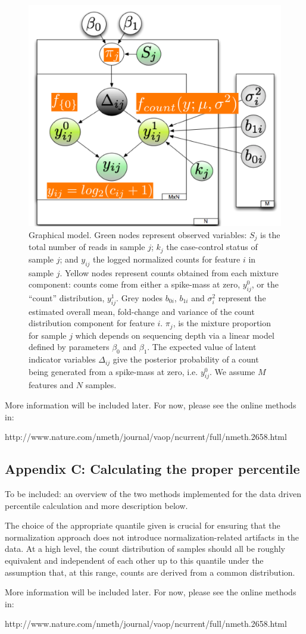 \documentclass[a4paper,11pt]{article}\usepackage[]{graphicx}\usepackage[]{color}
\begin{document}
\begin{figure}
\centerline{\includegraphics[width=.7\textwidth]{metagenomeSeq_figure2.png}}
\caption{\footnotesize{Graphical model. Green nodes represent observed variables: $S_j$ is the
total number of reads in sample $j$; $k_j$ the case-control status
of sample $j$; and $y_{ij}$ the logged normalized counts for feature $i$ in sample $j$. Yellow nodes represent counts obtained from each mixture component: counts come from either a spike-mass at zero,
$y_{ij}^0$, or the ``count'' distribution, $y_{ij}^1$. Grey nodes $b_{0i}$, $b_{1i}$ and $\sigma_{i}^2$ represent the
estimated overall mean, fold-change and variance of the count distribution component for feature $i$. $\pi_j$, is the mixture proportion for sample $j$ which depends on sequencing depth via a linear model defined by parameters $\beta_0$ and $\beta_1$. The expected value of latent indicator variables $\Delta_{ij}$ give the posterior  probability of a count being generated from a spike-mass at zero, i.e. $y_{ij}^0$. We assume $M$ features and $N$ samples.}}
\end{figure}

More information will be included later.  For now, please see the online methods in: 

http://www.nature.com/nmeth/journal/vaop/ncurrent/full/nmeth.2658.html

\subsection{Appendix C: Calculating the proper percentile} To be included: an overview of the two methods implemented for the data driven percentile calculation and more description below.


The choice of the appropriate quantile given is crucial for ensuring that the normalization approach does not introduce normalization-related artifacts in the data. At a high level, the count distribution of samples should all be roughly equivalent and independent of each other up to this quantile under the assumption that, at this range, counts are derived from a common distribution.


More information will be included later. For now, please see the online methods in: 

http://www.nature.com/nmeth/journal/vaop/ncurrent/full/nmeth.2658.html

\newpage

\end{document}
